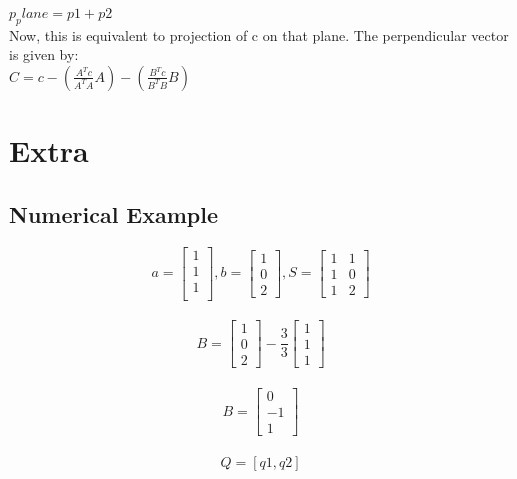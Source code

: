 \documentclass[]{article}
\begin{document}
\noindent
$p_plane=p1+p2$\\

\noindent
Now, this is equivalent to projection of c on that plane. The perpendicular vector is given by:\\

\noindent
$C=c-(\frac{A^Tc}{A^TA}A) - (\frac{B^Tc}{B^TB}B)$\\

\vspace{10pt}

\section{Extra}
\vspace{10pt}
\subsection{Numerical Example}
\vspace{10pt}
\[
a=\begin{bmatrix}
	1\\
	1\\
	1\\
\end{bmatrix}, b=\begin{bmatrix}
1\\
0\\
2
\end{bmatrix}, S=\begin{bmatrix}
1&1\\
1&0\\
1&2
\end{bmatrix}
\]\\

\noindent
\[
B=\begin{bmatrix}
	1\\
	0\\
	2
\end{bmatrix}-\frac{3}{3}\begin{bmatrix}
1\\
1\\
1
\end{bmatrix}
\]\\

\noindent
\[
B=\begin{bmatrix}
	0\\
	-1\\
	1
\end{bmatrix}
\]\\

\noindent
\[
Q=[q1,q2]
\]\\
\end{document}
